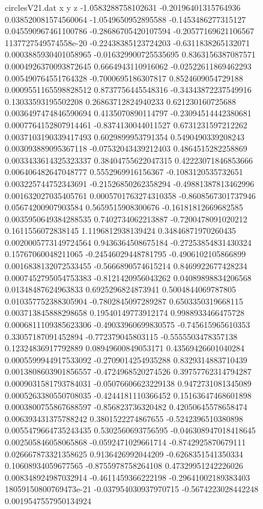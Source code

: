 \begin{filecontents}{circlesV21.dat}
x y z
-1.0583288758102631	-0.20196401315764936	0.038520081574560064
-1.0549650952895588	-0.1453486277315127	0.045590967461100786
-0.28686705420107594	-0.20577169621106567	1137727549574558e-20
-0.22438385123724203	-0.6311838265132071	0.0003885930401058965
-0.016329900725535695	0.8363156387087571	0.0004926370093872645
0.6664943110916062	-0.02522611869462293	0.005490764551764328
-0.7000695186307817	0.8524609054729188	0.0009551165598828512
0.8737756445548316	-0.34343872237549916	0.13033593195502208
0.26863712824940233	0.621230160725688	0.0036497474846590694
0.4135070890114797	-0.23094514442380681	0.0007764152807914461
-0.8374130044011527	0.6731231597212262	0.0037103190339417493
0.6029899953791354	0.5490490339208243	0.003093889095367118
-0.07532043439212403	0.4864515282258869	0.0033433614325323337
0.38404755622047315	0.42223071846853666	0.006406482647048777
0.5552969916156367	-0.1083120535732651	0.003225744752343691
-0.21526850262358294	-0.49881387813462996	0.001632027035405761
0.0005701763274310358	-0.8608567301737946	0.05674200907903584
0.5659515908300676	-0.16181812669682585	0.0035950649384288535
0.7402734062213887	-0.7200478091020212	0.1611556072838145
1.1196812938139424	0.34846871970260435	0.0020005773149724564
0.9436364508675184	-0.27253854831430324	0.15767060048211065
-0.24546029448781795	-0.4906102105866899	0.0016838132072533455
-0.5666890574615214	0.8469922677428234	0.0007452795054753383
-0.8121420956043262	0.04089898834206568	0.01348487624963833
0.6925296824873941	0.5004844069787805	0.010357752388305904
-0.7802845097289287	0.6503350319668115	0.003713845888298658
0.19540149773912174	0.9988933466475728	0.0006811109385623306
-0.49033960699830575	-0.745615965610353	0.33057187091452894
-0.772379045803115	-0.5555503478357138	0.12324836917792889
0.08949600849053171	0.43569426601040284	0.0005599944917533092
-0.2709014254935288	0.8329314883710439	0.0013808603901856557
-0.4724968520274526	0.39757762314794287	0.0009031581793784031
-0.05076606623229138	0.9472731081345089	0.0005263380550708035
-0.4244181110366452	0.15163647468601898	0.0003800755867688597
-0.856823736320482	0.42050645578658474	0.006393431375788242
0.3801522274867655	-0.5242396510380898	0.0055479664735243435
0.5302560693756595	-0.046308947018418645	0.002505846058065868
-0.0592471029661714	-0.8742925870679111	0.026667873321358625
0.9136426992044209	-0.6268351541350334	0.10608934059677565
-0.8755978758264108	0.47329951242226026	0.008348924987032914
-0.4611459366222198	-0.29641002189383403	18059150800769473e-21
-0.037954030937970715	-0.5674223028442248	0.0019547557950134924

\end{filecontents}
